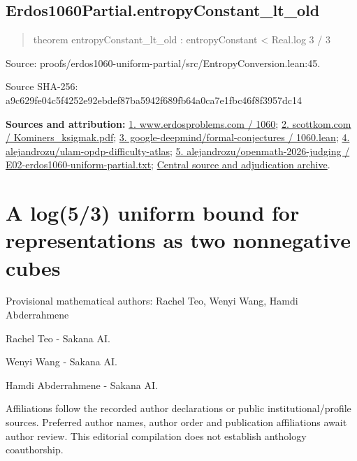 \documentclass[11pt,a4paper]{article}
\begin{document}
\begin{samepage}
\subsection{Erdos1060Partial.entropyConstant\_lt\_old}
\begin{quote}\small\ttfamily theorem entropyConstant\_lt\_old : entropyConstant < Real.log 3 / 3\end{quote}
{\small Source: proofs/erdos1060-uniform-partial/src/EntropyConversion.lean:45.\par}

{\small Source SHA-256: a9c629fe04c5f4252e92ebdef87ba5942f689fb64a0ca7e1fbc46f8f3957dc14\par}

{\small\textbf{Sources and attribution:} \href{https://www.erdosproblems.com/1060}{1. www.erdosproblems.com / 1060}; \href{https://scottkom.com/assets/articles/Kominers_ksigmak.pdf}{2. scottkom.com / Kominers\_ksigmak.pdf}; \href{https://github.com/google-deepmind/formal-conjectures/blob/main/FormalConjectures/ErdosProblems/1060.lean}{3. google-deepmind/formal-conjectures / 1060.lean}; \href{https://github.com/alejandrozu/ulam-opdp-difficulty-atlas}{4. alejandrozu/ulam-opdp-difficulty-atlas}; \href{https://github.com/alejandrozu/openmath-2026-judging/blob/d0ed487f487fa7ec814ff705ab55249983fe8707/OpenMath-Judging/review/entries/E02-erdos1060-uniform-partial.txt}{5. alejandrozu/openmath-2026-judging / E02-erdos1060-uniform-partial.txt}; \href{https://github.com/alejandrozu/openmath-2026-judging}{Central source and adjudication archive}.\par}

\end{samepage}
\clearpage
\section{A log(5/3) uniform bound for representations as two nonnegative cubes}
{\small Provisional mathematical authors: Rachel Teo, Wenyi Wang, Hamdi Abderrahmene\par}\medskip
{\small Rachel Teo  -  Sakana AI.\par}

{\small Wenyi Wang  -  Sakana AI.\par}

{\small Hamdi Abderrahmene  -  Sakana AI.\par}

{\small Affiliations follow the recorded author declarations or public institutional/profile sources. Preferred author names, author order and publication affiliations await author review. This editorial compilation does not establish anthology coauthorship.\par}
\end{document}
